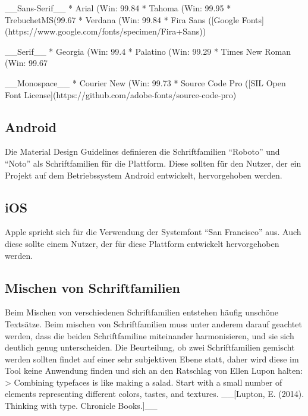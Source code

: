 __Sans-Serif__
* Arial (Win: 99.84%
* Tahoma (Win: 99.95%
* TrebuchetMS(99.67%
* Verdana (Win: 99.84%
* Fira Sans ([Google Fonts](https://www.google.com/fonts/specimen/Fira+Sans))

__Serif__
* Georgia (Win: 99.4%
* Palatino (Win: 99.29%
* Times New Roman (Win: 99.67%

__Monospace__
* Courier New (Win: 99.73%
* Source Code Pro ([SIL Open Font License](https://github.com/adobe-fonts/source-code-pro)

\subsection{Android}
Die Material Design Guidelines definieren die Schriftfamilien “Roboto” und “Noto” als Schriftfamilien für die Plattform. Diese sollten für den Nutzer, der ein Projekt auf dem Betriebssystem Android entwickelt, hervorgehoben werden.


\subsection{iOS}
Apple spricht sich für die Verwendung der Systemfont “San Francisco” aus. Auch diese sollte einem Nutzer, der für diese Plattform entwickelt hervorgehoben werden.

\subsection{Mischen von Schriftfamilien}
Beim Mischen von verschiedenen Schriftfamilien entstehen häufig unschöne Textsätze. Beim mischen von Schriftfamilien muss unter anderem darauf geachtet werden, dass die beiden Schriftfamiline miteinander harmonisieren, und sie sich deutlich genug unterscheiden.
Die Beurteilung, ob zwei Schriftfamilien gemischt werden sollten  findet auf einer sehr subjektiven Ebene statt, daher wird diese im Tool keine Anwendung finden und sich an den Ratschlag von Ellen Lupon halten:
> Combining typefaces is like making a salad. Start with a small number of elements representing different colors, tastes, and textures. __[Lupton, E. (2014). Thinking with type. Chronicle Books.]__


